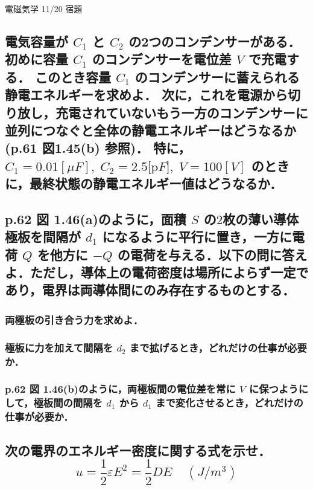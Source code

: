 \documentclass[a4paper, 12pt]{bxjsarticle}
\begin{document}
\begin{center}
    \begin{huge}
        電磁気学 11/20 宿題
    \end{huge}
\end{center}

\subsection{電気容量が \(C_1\) と \(C_2\) の2つのコンデンサーがある．初めに容量 \(C_1\) のコンデンサーを電位差 \(V\) で充電する．
このとき容量 \(C_1\) のコンデンサーに蓄えられる静電エネルギーを求めよ．
次に，これを電源から切り放し，充電されていないもう一方のコンデンサーに並列につなぐと全体の静電エネルギーはどうなるか(p.61 図1.45(b) 参照)．
特に，\(C_1 = 0.01\si{[\mu F]},\;C_2 = 2.5\si{[\pico F]},\;V=100\si{[V]}\) のときに，最終状態の静電エネルギー値はどうなるか．}

\newpage
\begin{samepage}
\subsection{p.62 図 1.46(a)のように，面積 \(S\) の\(2\)枚の薄い導体極板を間隔が \(d_1\) になるように平行に置き，一方に電荷 \(Q\) を他方に \(-Q\) の電荷を与える．以下の問に答えよ．ただし，導体上の電荷密度は場所によらず一定であり，電界は両導体間にのみ存在するものとする．}
\subsubsection{両極板の引き合う力を求めよ．}
\vspace{13em}
\subsubsection{極板に力を加えて間隔を \(d_2\) まで拡げるとき，どれだけの仕事が必要か．}
\vspace{13em}
\subsubsection{p.62 図 1.46(b)のように，両極板間の電位差を常に \(V\) に保つようにして，極板間の間隔を \(d_1\) から \(d_1\) まで変化させるとき，どれだけの仕事が必要か．}
\end{samepage}
\newpage

\subsection{次の電界のエネルギー密度に関する式を示せ．\[u=\frac{1}{2}\varepsilon E^2 = \frac{1}{2} D E\;\;\;\;\si{(J/m^3)}\]}
\end{document}

